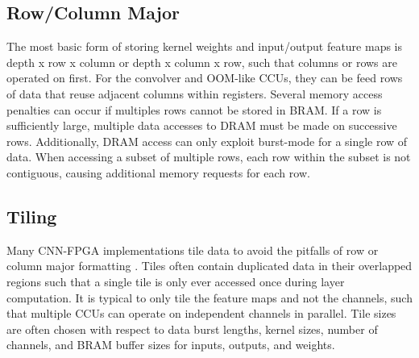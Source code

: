 \subsection{Row/Column Major}
The most basic form of storing kernel weights and input/output feature maps is depth x row x column or depth x column x row, such that columns or rows are operated on first. For the convolver and OOM-like CCUs, they can be feed rows of data that reuse adjacent columns within registers. Several memory access penalties can occur if multiples rows cannot be stored in BRAM. If a row is sufficiently large, multiple data accesses to DRAM must be made on successive rows. Additionally, DRAM access can only exploit burst-mode for a single row of data. When accessing a subset of multiple rows, each row within the subset is not contiguous, causing additional memory requests for each row.

\subsection{Tiling}
Many CNN-FPGA implementations tile data to avoid the pitfalls of row or column major formatting \cite{tu2017deep, dicecco2016caffeinated, bettoni2017convolutional, guo2018angel}. Tiles often contain duplicated data in their overlapped regions such that a single tile is only ever accessed once during layer computation. It is typical to only tile the feature maps and not the channels, such that multiple CCUs can operate on independent channels in parallel. Tile sizes are often chosen with respect to data burst lengths, kernel sizes, number of channels, and BRAM buffer sizes for inputs, outputs, and weights.
